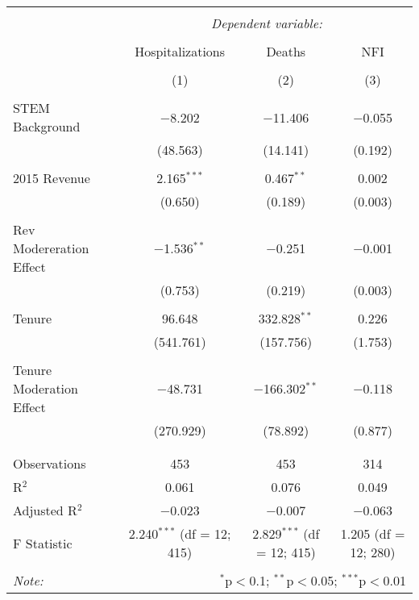 
\begin{table}[!htbp] \centering 
  \caption{} 
  \label{} 
\begin{tabular}{@{\extracolsep{5pt}}lccc} 
\\[-1.8ex]\hline 
\hline \\[-1.8ex] 
 & \multicolumn{3}{c}{\textit{Dependent variable:}} \\ 
\cline{2-4} 
\\[-1.8ex] & Hospitalizations & Deaths & NFI \\ 
\\[-1.8ex] & (1) & (2) & (3)\\ 
\hline \\[-1.8ex] 
 STEM Background & $-$8.202 & $-$11.406 & $-$0.055 \\ 
  & (48.563) & (14.141) & (0.192) \\ 
  & & & \\ 
 2015 Revenue & 2.165$^{***}$ & 0.467$^{**}$ & 0.002 \\ 
  & (0.650) & (0.189) & (0.003) \\ 
  & & & \\ 
 Rev Modereration Effect & $-$1.536$^{**}$ & $-$0.251 & $-$0.001 \\ 
  & (0.753) & (0.219) & (0.003) \\ 
  & & & \\ 
 Tenure & 96.648 & 332.828$^{**}$ & 0.226 \\ 
  & (541.761) & (157.756) & (1.753) \\ 
  & & & \\ 
 Tenure Moderation Effect & $-$48.731 & $-$166.302$^{**}$ & $-$0.118 \\ 
  & (270.929) & (78.892) & (0.877) \\ 
  & & & \\ 
\hline \\[-1.8ex] 
Observations & 453 & 453 & 314 \\ 
R$^{2}$ & 0.061 & 0.076 & 0.049 \\ 
Adjusted R$^{2}$ & $-$0.023 & $-$0.007 & $-$0.063 \\ 
F Statistic & 2.240$^{***}$ (df = 12; 415) & 2.829$^{***}$ (df = 12; 415) & 1.205 (df = 12; 280) \\ 
\hline 
\hline \\[-1.8ex] 
\textit{Note:}  & \multicolumn{3}{r}{$^{*}$p$<$0.1; $^{**}$p$<$0.05; $^{***}$p$<$0.01} \\ 
\end{tabular} 
\end{table} 
